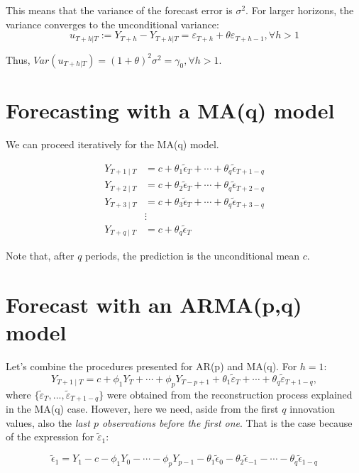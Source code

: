 \documentclass[11pt, a4paper]{report}
\theoremstyle{plain}
\theoremstyle{plain}
\theoremstyle{remark}
\begin{document}
This means that the variance of the forecast error is $\sigma^2$. For larger horizons, the variance converges to the unconditional variance: 
$$ u_{T+h|T} := Y_{T+h} - Y_{T+h|T} = \varepsilon_{T+h} + \theta \varepsilon_{T+h-1}, \forall h>1$$

Thus, $ Var(u_{T+h|T}) = (1+\theta)^2 \sigma^2 = \gamma_0, \forall h > 1$.

\section{Forecasting with a MA(q) model}

We can proceed iteratively for the MA(q) model.

$$\begin{aligned}
	Y_{T+1 \mid T} &=c+\theta_{1} \widetilde{\epsilon}_{T}+\cdots+\theta_{q} \widetilde{\epsilon}_{T+1-q} \\
	Y_{T+2 \mid T} &=c+\theta_{2} \widetilde{\epsilon}_{T}+\cdots+\theta_{q} \widetilde{\epsilon}_{T+2-q} \\
	Y_{T+3 \mid T} &=c+\theta_{3} \widetilde{\epsilon}_{T}+\cdots+\theta_{q} \widetilde{\epsilon}_{T+3-q} \\
	& \vdots \\
	Y_{T+q \mid T} &=c+\theta_{q} \widetilde{\epsilon}_{T}
\end{aligned}$$

Note that, after $q$ periods, the prediction is the unconditional mean $c$.

\section{Forecast with an ARMA(p,q) model}

Let's combine the procedures presented for AR(p) and MA(q). For $h=1$:
$$Y_{T+1 \mid T}=c+\phi_{1} Y_{T}+\cdots+\phi_{p} Y_{T-p+1}+\theta_{1} \widetilde{\varepsilon}_{T}+\cdots+\theta_{q} \widetilde{\varepsilon}_{T+1-q},$$
where $\{\widetilde{\varepsilon}_{T}, ..., \widetilde{\varepsilon}_{T+1-q}\}$ were obtained from the reconstruction process explained in the MA(q) case. However, here we need, aside from the first $q$ innovation values, also the \textit{last $p$ observations before the first one}. That is the case because of the expression for $\widetilde{\varepsilon}_{1}$:

$$\widetilde{\epsilon}_{1}=Y_{1}-c-\phi_{1} Y_{0}-\cdots-\phi_{p} Y_{p-1}-\theta_{1} \widetilde{\epsilon}_{0}-\theta_{2} \widetilde{\epsilon}_{-1}-\cdots-\theta_{q} \widetilde{\epsilon}_{1-q}$$
\end{document}
